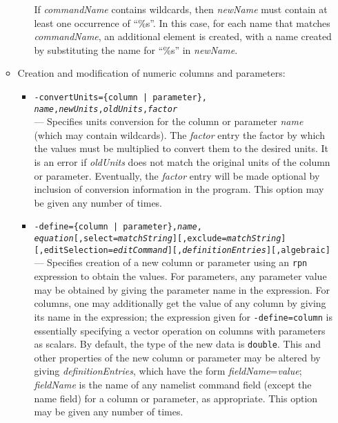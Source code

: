 \begin{itemize}
\begin{itemize}
\begin{itemize}
        If {\em commandName} contains wildcards, then {\em newName} must contain at least one occurrence of
``\%s''.   In this case, for each name that matches {\em commandName}, an additional element is created, with a
name created by substituting the name for ``\%s'' in {\em newName}.

 
         \end{itemize}
 
    \item Creation and modification of numeric columns and parameters: \\

        \begin{itemize}

        \item {\tt -convertUnits=\{column | parameter\},{\em
name},{\em newUnits},}{\tt {\em oldUnits},{\em factor}}\\ ---
Specifies units conversion for the column or parameter {\em name}
(which may contain wildcards).  The {\em factor} entry the factor by
which the values must be multiplied to convert them to the desired
units.  It is an error if {\em oldUnits} does not match the original
units of the column or parameter.  Eventually, the {\em factor} entry
will be made optional by inclusion of conversion information in the
program.  This option may be given any number of times.

        \item {\tt -define=\{column | parameter\},{\em name},{\em
equation}[,select={\em matchString}][,exclude={\em matchString}]} 
{\tt [,editSelection={\em editCommand}][,{\em definitionEntries}][,algebraic] }\\ --- Specifies
creation of a new column or parameter using an {\tt rpn} expression to
obtain the values.  For parameters, any parameter value may be
obtained by giving the parameter name in the expression.  For columns,
one may additionally get the value of any column by giving its name in
the expression; the expression given for {\tt -define=column} is
essentially specifying a vector operation on columns with parameters
as scalars.  By default, the type of the new data is \verb|double|.
This and other properties of the new column or parameter may be
altered by giving {\em definitionEntries}, which have the form {\em
fieldName}={\em value}; {\em fieldName} is the name of any namelist
command field (except the name field) for a column or parameter, as
appropriate.  This option may be given any number of times.


\end{itemize}
\end{itemize}
\end{itemize}

